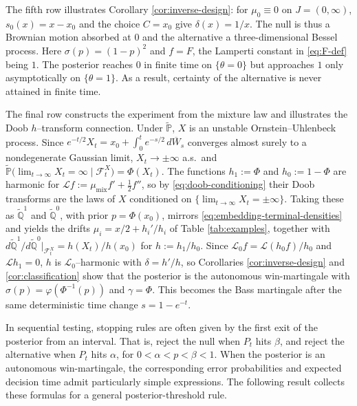 \documentclass[11pt, reqno]{amsart}
\theoremstyle{plain}
\theoremstyle{remark}
\numberwithin{equation}{section}
\begin{document}
The fifth row illustrates Corollary \ref{cor:inverse-design}: for $\mu_0\equiv0$ on $J=(0,\infty)$, $s_0(x)=x-x_0$ and the choice $C=x_0$ give $\delta(x)=1/x$. The null is thus a Brownian motion absorbed at $0$ and the alternative a three-dimensional Bessel process. Here $\sigma(p)=(1-p)^2$ and $f=F$, the Lamperti constant in \eqref{eq:F-def} being $1$. The posterior reaches $0$ in finite time on $\{\theta=0\}$ but approaches $1$ only asymptotically on $\{\theta=1\}$. As a result, certainty of the alternative is never attained in finite time.

The final row constructs the experiment from the mixture law and illustrates the Doob $h$--transform connection. Under $\widetilde{\mathbb P}$, $X$ is an unstable Ornstein--Uhlenbeck process. Since
$e^{-t/2}X_t=x_0+\int_0^te^{-s/2}\,d\overline W_s$ converges almost surely to a nondegenerate Gaussian limit, $X_t\to\pm\infty$ a.s.\ and $\widetilde{\mathbb P}\bigl(\lim_{t\to\infty}X_t=\infty\mid\mathcal F^X_t\bigr)=\Phi(X_t)$. The functions $h_1:=\Phi$ and $h_0:=1-\Phi$ are harmonic for $\mathcal Lf:=\mu_{\mathrm{mix}}f'+\tfrac12f''$, so by \eqref{eq:doob-conditioning} their Doob transforms are the laws of $X$ conditioned on $\{\lim_{t\to\infty}X_t=\pm\infty\}$. Taking these as $\widetilde{\mathbb Q}^1$ and $\widetilde{\mathbb Q}^0$, with prior $p=\Phi(x_0)$, mirrors \eqref{eq:embedding-terminal-densities} and yields the drifts $\mu_i=x/2+h_i'/h_i$ of Table \ref{tab:examples}, together with $d\widetilde{\mathbb Q}^1/d\widetilde{\mathbb Q}^0|_{\mathcal F^X_t} =h(X_t)/h(x_0)$ for $h:=h_1/h_0$. Since $\mathcal L_0f=\mathcal L(h_0f)/h_0$ and $\mathcal Lh_1=0$, $h$ is $\mathcal L_0$--harmonic with $\delta=h'/h$, so Corollaries \ref{cor:inverse-design} and \ref{cor:classification} show that the posterior is the autonomous win-martingale with $\sigma(p)=\varphi(\Phi^{-1}(p))$ and $\gamma=\Phi$. This becomes the Bass martingale \cite{backhoff2025bass} after the same deterministic time change $s=1-e^{-t}$.

%
%
%
%
%
%

%

%
%

%

%
%
%

%
%
%
%
%
%



%
%
%
%
%
%
%
%
%
%





%
%
In sequential testing, stopping rules are often given by the first exit of the posterior from an interval. That is, reject the null when $P_t$ hits $\beta$, and reject the alternative when $P_t$ hits $\alpha$, for $0<\alpha<p<\beta<1$. When the posterior is an autonomous win-martingale, the corresponding error probabilities and expected decision time admit particularly simple expressions. The following result collects these formulas for a general posterior-threshold rule.
\end{document}
